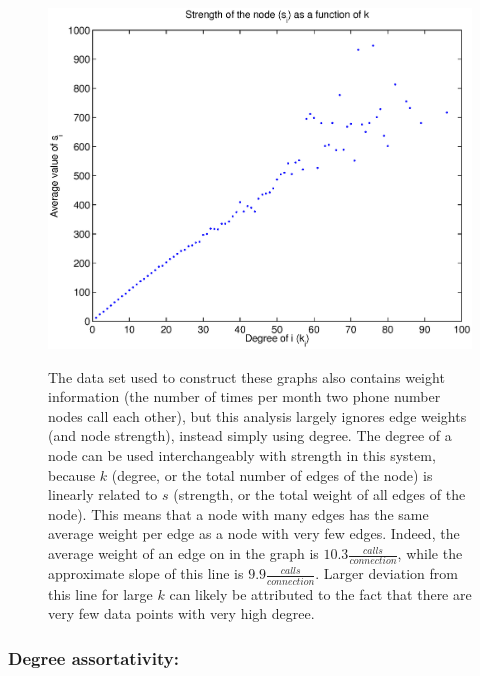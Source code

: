 \documentclass[12pt]{article}
\begin{document}
\begin{figure}[H]
\includegraphics[trim = 0cm 0cm 0cm 0cm, width = .9\textwidth]{Graficos/svsk.eps}
\label{fig:svsk}
\caption{The data set used to construct these graphs also contains weight information (the number of times per month two phone number nodes call each other), but this analysis largely ignores edge weights (and node strength), instead simply using degree. The degree of a node can be used interchangeably with strength in this system, because \(k\) (degree, or the total number of edges of the node) is linearly related to \(s\) (strength, or the total weight of all edges of the node). This means that a node with many edges has the same average weight per edge as a node with very few edges. Indeed, the average weight of an edge on in the graph is \(10.3 \frac{calls}{connection}\), while the approximate slope of this line is \(9.9  \frac{calls}{connection}\). Larger deviation from this line for large \(k\) can likely be attributed to the fact that there are very few data points with very high degree.}
\end{figure}

\subsubsection*{Degree assortativity:}

\end{document}
